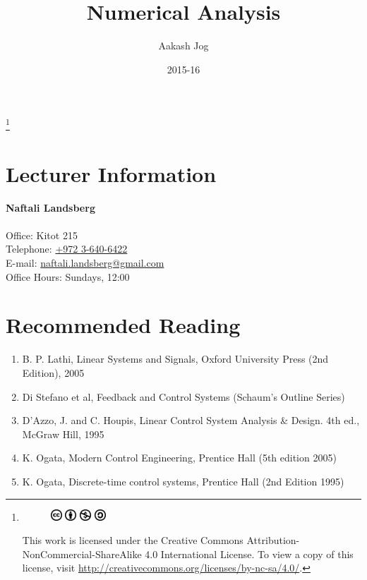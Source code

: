 \documentclass[fleqn, a4paper, 12pt, twoside]{article}
\title{Numerical Analysis}
\author{Aakash Jog}
\date{2015-16}
\theoremstyle{definition}
\theoremstyle{theorem}
\newcommand\blfootnote[1]{%
	\begingroup
	\renewcommand\thefootnote{}\footnote{#1}%
	\addtocounter{footnote}{-1}%
	\endgroup
}
\begin{document}
\maketitle

\blfootnote
{	
	\begin{figure}[H]
		\includegraphics[height = 12pt]{cc.eps}
		\includegraphics[height = 12pt]{by.eps}
		\includegraphics[height = 12pt]{nc.eps}
		\includegraphics[height = 12pt]{sa.eps}
	\end{figure}
	This work is licensed under the Creative Commons Attribution-NonCommercial-ShareAlike 4.0 International License. To view a copy of this license, visit \url{http://creativecommons.org/licenses/by-nc-sa/4.0/}.
} %

\tableofcontents

\newpage
\section{Lecturer Information}

\textbf{Naftali Landsberg}\\
~\\
Office: Kitot 215\\
Telephone: \href{tel:+972 3-640-6422}{+972 3-640-6422}\\
E-mail: \href{mailto:naftali.landsberg@gmail.com}{naftali.landsberg@gmail.com}\\
Office Hours: Sundays, 12:00

\section{Recommended Reading}

\begin{enumerate}
	\item B. P. Lathi, Linear Systems and Signals, Oxford University Press (2nd Edition), 2005
	\item Di Stefano et al, Feedback and Control Systems (Schaum’s Outline Series)
	\item D’Azzo, J. and C. Houpis, Linear Control System Analysis \& Design. 4th ed.,
McGraw Hill, 1995
	\item K. Ogata, Modern Control Engineering, Prentice Hall (5th edition 2005)
	\item K. Ogata, Discrete-time control systems, Prentice Hall (2nd Edition 1995)	
\end{enumerate}
\end{document}
